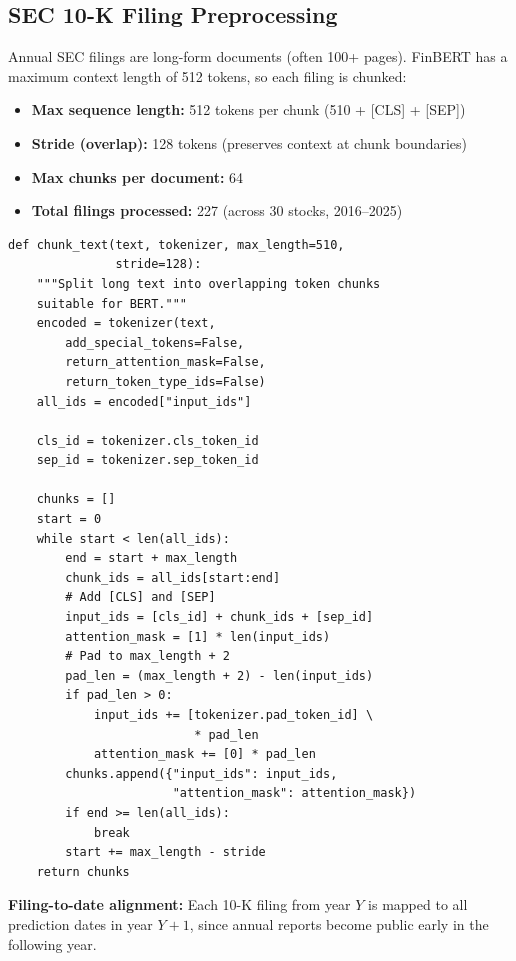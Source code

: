 \documentclass[12pt,a4paper]{article}
\begin{document}
\subsection{SEC 10-K Filing Preprocessing}

Annual SEC filings are long-form documents (often 100+ pages). FinBERT has a maximum context length of 512 tokens, so each filing is chunked:

\begin{itemize}[noitemsep]
    \item \textbf{Max sequence length:} 512 tokens per chunk (510 + [CLS] + [SEP])
    \item \textbf{Stride (overlap):} 128 tokens (preserves context at chunk boundaries)
    \item \textbf{Max chunks per document:} 64
    \item \textbf{Total filings processed:} 227 (across 30 stocks, 2016--2025)
\end{itemize}

\begin{lstlisting}[caption={Text chunking (src/data/preprocessing.py)}]
def chunk_text(text, tokenizer, max_length=510,
               stride=128):
    """Split long text into overlapping token chunks
    suitable for BERT."""
    encoded = tokenizer(text,
        add_special_tokens=False,
        return_attention_mask=False,
        return_token_type_ids=False)
    all_ids = encoded["input_ids"]

    cls_id = tokenizer.cls_token_id
    sep_id = tokenizer.sep_token_id

    chunks = []
    start = 0
    while start < len(all_ids):
        end = start + max_length
        chunk_ids = all_ids[start:end]
        # Add [CLS] and [SEP]
        input_ids = [cls_id] + chunk_ids + [sep_id]
        attention_mask = [1] * len(input_ids)
        # Pad to max_length + 2
        pad_len = (max_length + 2) - len(input_ids)
        if pad_len > 0:
            input_ids += [tokenizer.pad_token_id] \
                          * pad_len
            attention_mask += [0] * pad_len
        chunks.append({"input_ids": input_ids,
                       "attention_mask": attention_mask})
        if end >= len(all_ids):
            break
        start += max_length - stride
    return chunks
\end{lstlisting}

\textbf{Filing-to-date alignment:} Each 10-K filing from year $Y$ is mapped to all prediction dates in year $Y+1$, since annual reports become public early in the following year.
\end{document}
